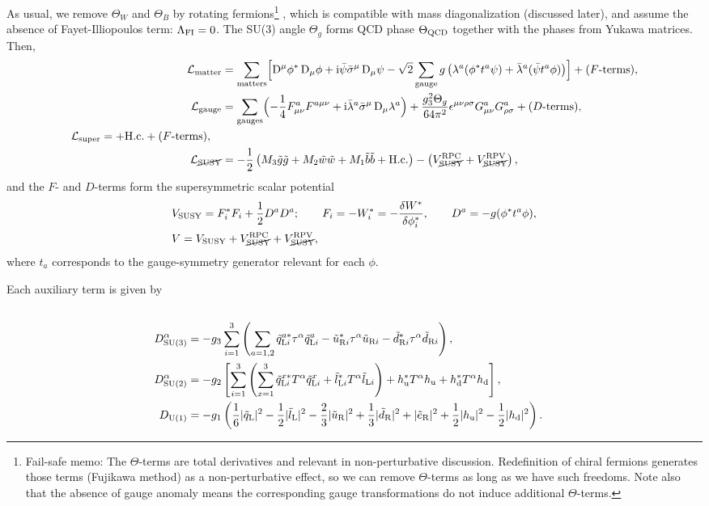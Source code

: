 \documentclass[CheatSheet]{subfiles}
\begin{document}
As usual, we remove $\Theta_W$ and $\Theta_B$ by rotating fermions\footnote{%
Fail-safe memo:
The $\Theta$-terms are total derivatives and relevant in non-perturbative discussion.
Redefinition of chiral fermions generates those terms (Fujikawa method) as a non-perturbative effect, so we can remove $\Theta$-terms as long as we have such freedoms.
Note also that the absence of gauge anomaly means the corresponding gauge transformations do not induce additional $\Theta$-terms.
}
, which is compatible with mass diagonalization (discussed later), and assume the absence of Fayet-Illiopoulos term: $\Lambda_{\mathrm{FI}}=0$.
The SU(3) angle $\Theta_g$ forms QCD phase $\Theta_{\mathrm{QCD}}$ together with the phases from Yukawa matrices.
Then,
\begin{align}
 \mathcal L\w{matter} &= \sum\w{matters}\Bigl[\DD^\mu\phi^*\DD_\mu\phi+\ii\bpsi\bsigma^\mu\DD_\mu\psi 
- \sqrt2\sum\w{gauge} g\left(\lambda^a(\phi^*t^a\psi)+\blambda^a(\bpsi t^a\phi)\right)
\Bigr] + \text{($F$-terms)},\\
 \mathcal L\w{gauge} &= \sum\w{gauges}\Bigl(-\frac14F^a_{\mu\nu}F^{a\mu\nu}+\ii\blambda^a\bsigma^\mu\DD_\mu\lambda^a\Bigr) + \frac{g_3^2\Theta_g}{64\pi^2}\epsilon^{\mu\nu\rho\sigma}G^a_{\mu\nu}G^a_{\rho\sigma}+ \text{($D$-terms)},
\\
\begin{split}
  \mathcal L\w{super} &=
   
+ \text{H.c.} +\text{($F$-terms)},
\end{split}\\
\mathcal L_{\text{\cancel{SUSY}}}
&=
- \frac12\left(M_3\tig\tig+M_2\tiw\tiw+M_1\tib\tib+\text{H.c.}\right)
-
\left(
V^{\mathrm{RPC}}_{\text{\cancel{SUSY}}}
+V^{\mathrm{RPV}}_{\text{\cancel{SUSY}}}\right),
\end{align}
and the $F$- and $D$-terms form the supersymmetric scalar potential
\begin{align}
& V_{\mathrm{SUSY}} = F^{*}_i F_i+\frac12 D^aD^a;
\qquad
 F_i = -W_i^* = -\frac{\delta W^*}{\delta \phi_i^*},
\qquad
 D^a = -g(\phi^* t^a \phi),
\\
&V=V_{\mathrm{SUSY}} +
V^{\mathrm{RPC}}_{\text{\cancel{SUSY}}}
+V^{\mathrm{RPV}}_{\text{\cancel{SUSY}}},
\end{align}
where $t_a$ corresponds to the gauge-symmetry generator relevant for each $\phi$.

Each auxiliary term is given by
\begin{align}

\\
D\w{SU(3)}^\alpha &= -g_3\sum_{i=1}^3\left(
 \sum_{a=1,2}
  \tqL[i]^{a*} \tau^\alpha \tqL[i]^{a}
- \tuR[i]^{*} \tau^\alpha \tuR[i]
- \tdR[i]^{*} \tau^\alpha \tdR[i]
\right),\\
%
D\w{SU(2)}^\alpha &= -g_2\left[
   \sum_{i=1}^3\left(
  \sum_{x=1}^3 \tqL[i]^{x*}T^\alpha\tqL[i]^{x}
+              \tlL[i]^{*}T^\alpha \tlL[i]
  \right)
+ \hu^*T^\alpha\hu
+ \hd^*T^\alpha\hd
\right],\\
%
 D\w{U(1)} &= -g_1\left(
  \frac16|\tqL|^2
- \frac12|\tlL|^2
- \frac23|\tuR|^2
+ \frac13|\tdR|^2
+        |\teR|^2
+ \frac12|\hu|^2
- \frac12|\hd|^2
\right).
\end{align}
\end{document}
